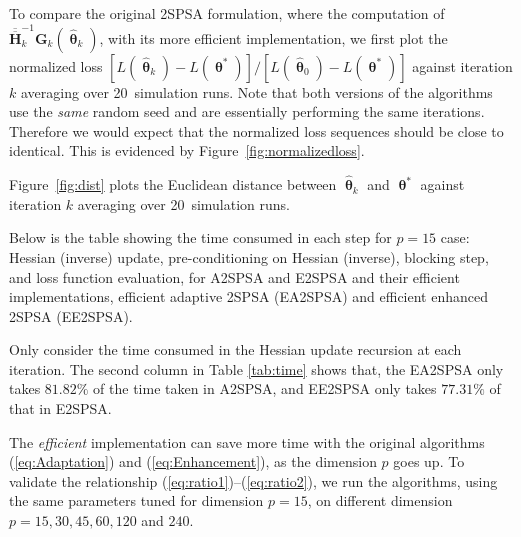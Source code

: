 \documentclass[conference,10.3cpt]{IEEEtran}
\newcommand{\bG}{\bm{G}}
\newcommand{\ooH}{\bm{\overline{\overline{H}}}}
\newcommand{\htheta}{\bm{\hat{\uptheta}}}
\begin{document}
\newcommand{\nruns}[0]{20\ }
To compare the original 2SPSA formulation, where the computation of $\ooH_k^{-1}
\bG_k(\htheta_k)$, with its more efficient
implementation, we first plot the normalized loss
$[L(\htheta_k)-L(\bm{\uptheta}^{*})]/[L(\htheta_0)-L(\bm{\uptheta}^{*})]$
against iteration $k$ averaging over \nruns simulation runs. Note that
both versions of the algorithms use the \textit{same} random seed and
are essentially performing the same iterations. Therefore we would expect
that the normalized loss sequences should be close to identical. This is evidenced by Figure~\ref{fig:normalizedloss}.

Figure~\ref{fig:dist} plots the Euclidean distance between
$\htheta_k$ and $\bm{\uptheta}^{*}$ against iteration $k$ averaging
over \nruns simulation runs.


Below is the table showing the time consumed in each step for $p=15$ case: Hessian (inverse) update, pre-conditioning on Hessian (inverse), blocking step, and loss function evaluation, for A2SPSA and E2SPSA and their efficient implementations, efficient adaptive 2SPSA (EA2SPSA) and efficient enhanced 2SPSA (EE2SPSA).

\begin{table}[htbp]
	\centering
		\caption{Time Consumed in Each Procedure for $p=15$
		 }
		\label{tab:time}
	\end{table}

Only consider the time consumed in the Hessian update recursion at each iteration. The second column in Table \ref{tab:time} shows that, the EA2SPSA only takes $81.82\%$ of the time taken in A2SPSA, and EE2SPSA only takes $77.31\%$ of that in E2SPSA.

The \textit{efficient} implementation can save more time with the original algorithms (\ref{eq:Adaptation}) and (\ref{eq:Enhancement}), as the dimension $p$ goes up. To validate the relationship (\ref{eq:ratio1})--(\ref{eq:ratio2}), we run the algorithms, using the same parameters tuned for dimension $p=15$, on different dimension $p=15,30,45,60,120$ and $240$.
\end{document}
